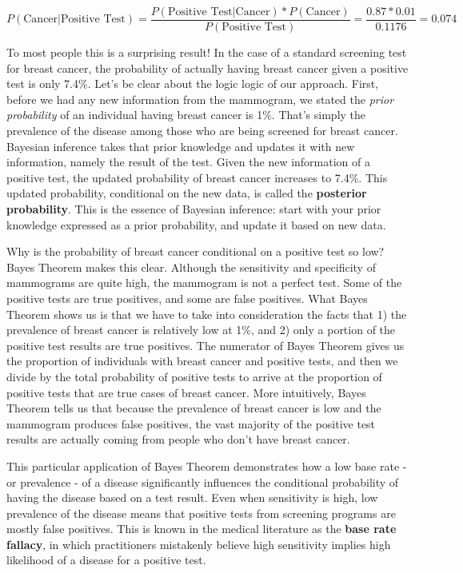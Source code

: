 \documentclass[
]{book}
\begin{document}
\[
P(\text{Cancer}|\text{Positive Test}) = \frac{P(\text{Positive Test|Cancer})*P(\text{Cancer})}{P(\text{Positive Test})}=\frac{0.87*0.01}{0.1176}=0.074
\]

To most people this is a surprising result! In the case of a standard
screening test for breast cancer, the probability of actually having
breast cancer given a positive test is only 7.4\%. Let's be clear about
the logic logic of our approach. First, before we had any new
information from the mammogram, we stated the \emph{prior probability} of an
individual having breast cancer is 1\%. That's simply the prevalence of
the disease among those who are being screened for breast cancer.
Bayesian inference takes that prior knowledge and updates it with new
information, namely the result of the test. Given the new information of
a positive test, the updated probability of breast cancer increases to
7.4\%. This updated probability, conditional on the new data, is called
the \textbf{posterior probability}. This is the essence of Bayesian
inference: start with your prior knowledge expressed as a prior
probability, and update it based on new data.

Why is the probability of breast cancer conditional on a positive test
so low? Bayes Theorem makes this clear. Although the sensitivity and
specificity of mammograms are quite high, the mammogram is not a perfect
test. Some of the positive tests are true positives, and some are false
positives. What Bayes Theorem shows us is that we have to take into
consideration the facts that 1) the prevalence of breast cancer is
relatively low at 1\%, and 2) only a portion of the positive test results
are true positives. The numerator of Bayes Theorem gives us the
proportion of individuals with breast cancer and positive tests, and
then we divide by the total probability of positive tests to arrive at
the proportion of positive tests that are true cases of breast cancer.
More intuitively, Bayes Theorem tells us that because the prevalence of
breast cancer is low and the mammogram produces false positives, the
vast majority of the positive test results are actually coming from
people who don't have breast cancer.

This particular application of Bayes Theorem demonstrates how a low base
rate - or prevalence - of a disease significantly influences the
conditional probability of having the disease based on a test result.
Even when sensitivity is high, low prevalence of the disease means that
positive tests from screening programs are mostly false positives. This
is known in the medical literature as the \textbf{base rate fallacy}, in
which practitioners mistakenly believe high sensitivity implies high
likelihood of a disease for a positive test.
\end{document}
